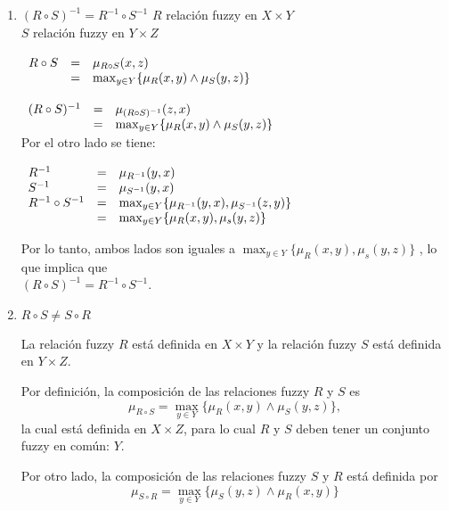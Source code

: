 \documentclass[letterpaper,spanish,11pt]{article}
\begin{document}
\begin{enumerate}
\item $(R\circ S)^{-1} = R^{-1}\circ S^{-1}$
$R$ relaci\'{o}n fuzzy en $X\times Y$\\
$S$ relaci\'{o}n fuzzy en $Y\times Z$\\


$\begin{array}{l l l }\\
R \circ S &= &\mu_{ R \circ S}(x,z)\\
 &= & \max_{y\in Y} \{\mu_{R}(x,y) \wedge \mu_{S}(y,z) \}\\
\end{array}$\\

$\begin{array}{l l l }\\
(R\circ S)^{-1} &= &\mu_{(R\circ S)^{-1}}(z,x)\\
 &= & \max_{y\in Y} \{\mu_{R}(x,y) \wedge \mu_{S}(y,z) \}\\
\end{array}$\\

Por el otro lado se tiene:\\
$\begin{array}{l l l}\\
R^{-1} &= &\mu_{R^{-1}}(y,x)\\
S^{-1} &= &\mu_{S^{-1}}(y,x)\\
R^{-1} \circ S^{-1}  &= &\max_{y\in Y}\{\mu_{R^{-1}}(y,x),\mu_{S^{-1}}(z,y)\}\\
 &= & \max_{y\in  Y}\{\mu_{R}(x,y),\mu_{s}(y,z)\}
\end{array}$

Por lo tanto, ambos lados son iguales a $\max_{y\in  Y}\{\mu_{R}(x,y),\mu_{s}(y,z)\}$ , lo
que implica que\\ $(R\circ S)^{-1} = R^{-1}\circ S^{-1}$.

\item $R \circ S  \neq S \circ R$

La relaci\'{o}n fuzzy $R$ est\'{a} definida en $X\times Y$ y la relaci\'{o}n fuzzy $S$
est\'{a} definida en $Y\times Z$.

Por definici\'{o}n, la composici\'{o}n de las relaciones fuzzy $R$ y $S$ es $$\mu_{R\circ S} = \max_{y \in
Y}\{\mu_{R}(x,y) \wedge \mu_{S}(y,z) \},$$ la cual est\'{a} definida en $X\times Z$, para lo
cual $R$ y $S$ deben tener un conjunto fuzzy en com\'{u}n: $Y$.

Por otro lado, la composici\'{o}n de las relaciones fuzzy $S$ y $R$ est\'{a} definida por
$$\mu_{S\circ R} = \max_{y \in Y}\{\mu_{S}(y,z) \wedge \mu_{R}(x,y) \}$$


\end{enumerate}
\end{document}
